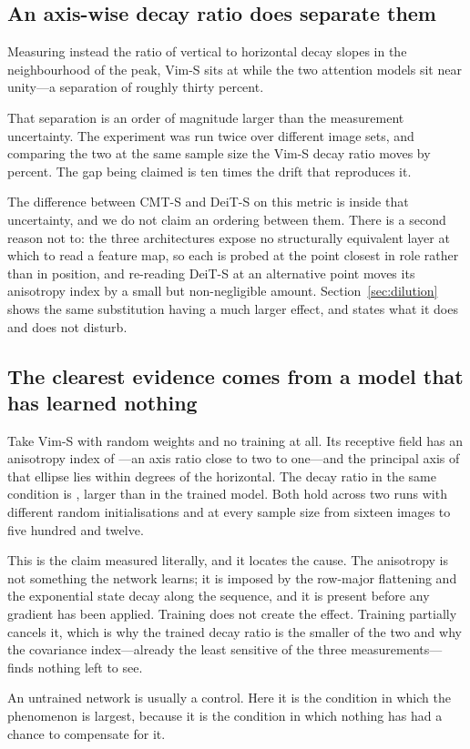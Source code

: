 \subsection{An axis-wise decay ratio does separate them}

Measuring instead the ratio of vertical to horizontal decay slopes in the
neighbourhood of the peak, Vim-S sits at \VimDecayNatural{} while the two
attention models sit near unity---a separation of roughly thirty percent.

That separation is an order of magnitude larger than the measurement
uncertainty. The experiment was run twice over different image sets, and
comparing the two at the same sample size the Vim-S decay ratio moves by
\VimDecayRunDrift{} percent. The gap being claimed is ten times the drift
that reproduces it.

The difference between CMT-S and DeiT-S on this metric is inside that
uncertainty, and we do not claim an ordering between them. There is a
second reason not to: the three architectures expose no structurally
equivalent layer at which to read a feature map, so each is probed at the
point closest in role rather than in position, and re-reading DeiT-S at an
alternative point moves its anisotropy index by a small but non-negligible
amount. Section~\ref{sec:dilution} shows the same substitution having a
much larger effect, and states what it does and does not disturb.

\subsection{The clearest evidence comes from a model that has learned nothing}

Take Vim-S with random weights and no training at all. Its receptive field
has an anisotropy index of \VimAnisoRandom{}---an axis ratio close to two to
one---and the principal axis of that ellipse lies within
\VimAngleRandom{} degrees of the horizontal. The decay ratio in the same
condition is \VimDecayRandom{}, larger than in the trained model. Both hold
across two runs with different random initialisations and at every sample
size from sixteen images to five hundred and twelve.

This is the claim measured literally, and it locates the cause. The
anisotropy is not something the network learns; it is imposed by the
row-major flattening and the exponential state decay along the sequence, and
it is present before any gradient has been applied. Training does not create
the effect. Training partially cancels it, which is why the trained decay
ratio is the smaller of the two and why the covariance index---already the
least sensitive of the three measurements---finds nothing left to see.

An untrained network is usually a control. Here it is the condition in which
the phenomenon is largest, because it is the condition in which nothing has
had a chance to compensate for it.
